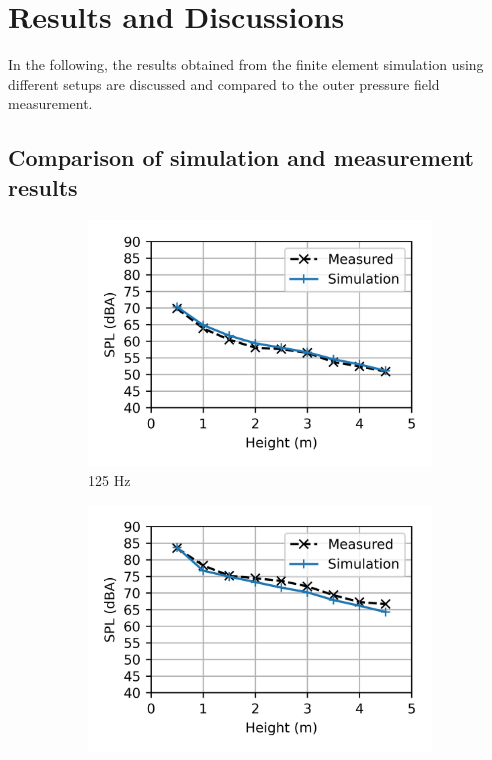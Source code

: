 \chapter{Results and Discussions}
\label{chap:results}

In the following, the results obtained from the finite element simulation using different setups are discussed and compared to the outer pressure field measurement.

\section{Comparison of simulation and measurement results}



\begin{figure}%
	\centering
	\begin{subfigure}[b]{0.49\textwidth}
		\centering
		\includegraphics{fig/chap5/initial_model/third_octave_over_height/125_Hz.png}
		\caption{125 Hz}
	\end{subfigure}
	\hfill
	\begin{subfigure}[b]{0.49\textwidth}
		\centering
		\includegraphics{fig/chap5/initial_model/third_octave_over_height/400_Hz.png}

\end{subfigure}
\end{figure}
